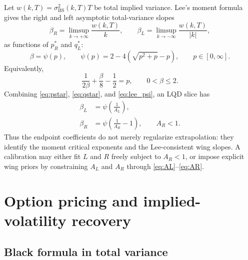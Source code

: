 \documentclass[11pt]{article}
\newcommand{\1}{\mathbf{1}}
\begin{document}
Let $w(k,T)=\sigma_{\mathrm{BS}}^2(k,T)T$ be total implied variance.  Lee's moment formula gives the right and left asymptotic total-variance slopes
\begin{equation}
    \beta_R=\limsup_{k\to+\infty}\frac{w(k,T)}{k},
    \qquad
    \beta_L=\limsup_{k\to-\infty}\frac{w(k,T)}{|k|},
\end{equation}
as functions of $p_R^*$ and $q_L^*$:
\begin{equation}
    \beta=\psi(p),\qquad
    \psi(p)=2-4\left(\sqrt{p^2+p}-p\right),\qquad p\in[0,\infty]. \label{eq:lee_psi}
\end{equation}
Equivalently,
\begin{equation}
    \frac{1}{2\beta}+\frac{\beta}{8}-\frac12=p,
    \qquad 0<\beta\le 2. \label{eq:lee_inverse}
\end{equation}
Combining \eqref{eq:pstar}, \eqref{eq:qstar}, and \eqref{eq:lee_psi}, an LQD slice has
\begin{align}
    \beta_L&=\psi\left(\frac{1}{A_L}\right), \label{eq:betaL}\\
    \beta_R&=\psi\left(\frac{1}{A_R}-1\right),\qquad A_R<1.\label{eq:betaR}
\end{align}
Thus the endpoint coefficients do not merely regularize extrapolation: they identify the moment critical exponents and the Lee-consistent wing slopes.  A calibration may either fit $L$ and $R$ freely subject to $A_R<1$, or impose explicit wing priors by constraining $A_L$ and $A_R$ through \eqref{eq:AL}--\eqref{eq:AR}.

\section{Option pricing and implied-volatility recovery}

\subsection{Black formula in total variance}
\end{document}
